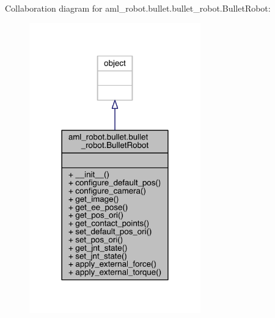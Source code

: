 Collaboration diagram for aml\+\_\+robot.\+bullet.\+bullet\+\_\+robot.\+Bullet\+Robot\+:\nopagebreak
\begin{figure}[H]
\begin{center}
\leavevmode
\includegraphics[width=210pt]{classaml__robot_1_1bullet_1_1bullet__robot_1_1_bullet_robot__coll__graph}
\end{center}
\end{figure}

